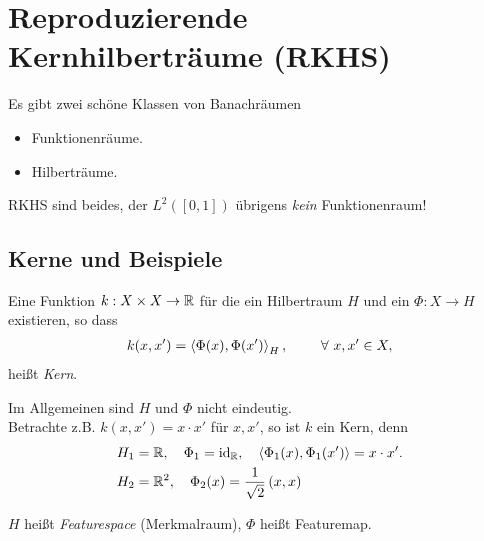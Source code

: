 \chapter{Reproduzierende Kernhilberträume (RKHS)}



Es gibt zwei schöne Klassen von Banachräumen
\begin{itemize}
  \item Funktionenräume.
  \item Hilberträume.
\end{itemize}

RKHS sind beides, der $L^2([0,1])$ übrigens \textit{kein} Funktionenraum!

\section{Kerne und Beispiele}

\begin{defn}
\label{defn:5.1.1}
Eine Funktion $k: X\times X\to\mathbb{R}$ für die ein Hilbertraum $H$ und ein $\Phi:
X\to H$ existieren, so dass
\begin{align*}
k(x,x') = \lin{\Phi(x),\Phi(x')}_H,\qquad \forall x,x'\in X,
\end{align*}
heißt \emph{Kern}.\fishhere{}
\end{defn}

\begin{bem*}[Bemerkungen.]
\begin{bemenum}
\item Im Allgemeinen sind $H$ und $\Phi$ nicht eindeutig.\\
Betrachte z.B. $k(x,x') = x\cdot x'$ für $x,x'$, so ist $k$ ein Kern, denn
\begin{align*}
&H_1 = \mathbb{R},\quad \Phi_1 = \operatorname{id}_{\mathbb{R}},\quad \left\langle\Phi_1(x),\Phi_1(x')\right\rangle = x\cdot x'.\\
&H_2 = \mathbb{R}^2,\quad \Phi_2(x) = \frac{1}{\sqrt{2}}\left(x,x\right)
\end{align*}
\item $H$ heißt \emph{Featurespace} (Merkmalraum), $\Phi$ heißt
Featuremap.\maphere
\end{bemenum}
\end{bem*}

